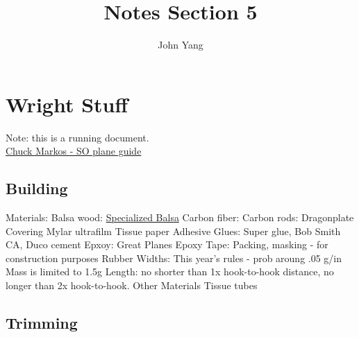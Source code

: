 \documentclass{article}
\title{Notes Section 5} %
\author{John Yang}
\begin{document}
    \maketitle
    \tableofcontents
    \section{Wright Stuff}
    Note: this is a running document. \\
    \small \href{https://freeflight.org/wp-content/uploads/2016/02/2009ScienceOlympiadManual.pdf}{Chuck Markos - SO plane guide} \normalsize 
    \subsection{Building}
    \begin{outline}
        \1 Materials:
            \2 Balsa wood:
                \3 \href{https://specializedbalsa.com/}{Specialized Balsa}
            \2 Carbon fiber:
                \3 
            \2 Carbon rods: 
                \3 Dragonplate
            \2 Covering
                \3 Mylar ultrafilm
                \3 Tissue paper
            \2 Adhesive
                \3 Glues: Super glue, Bob Smith CA, Duco cement
                \3 Epxoy: Great Planes Epoxy
                \3 Tape: Packing, masking - for construction purposes
            \2 Rubber
                \3 Widths: This year's rules - prob aroung .05 g/in
                \3 Mass is limited to 1.5g
                \3 Length: no shorter than 1x hook-to-hook distance, no longer than 2x hook-to-hook. 
            \2 Other Materials
                \3 Tissue tubes
                \3 
    \end{outline}
    \subsection{Trimming}
    \begin{outline}
        \1 
    \end{outline}
\end{document}
